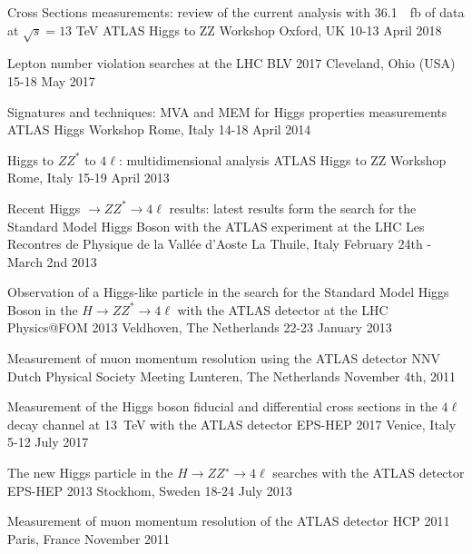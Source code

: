 
\begin{cvtalks}

\cvtalk
{Cross Sections measurements: review of the current analysis with \SI{36.1}{\per\femto\barn} of data at $\sqrt{s}=13$ \si{\tera\electronvolt}} %
{ATLAS Higgs to ZZ Workshop} %
{Oxford, UK} %
{10-13 April 2018} %

\cvtalk
{Lepton number violation searches at the LHC} %
{BLV 2017} %
{Cleveland, Ohio (USA)} %
{15-18 May 2017} %

\cvtalk
{Signatures and techniques: MVA and MEM for Higgs properties measurements} %
{ATLAS Higgs Workshop} %
{Rome, Italy} %
{14-18 April 2014} %

\cvtalk
{Higgs to $ZZ^{*}$ to $4\ell$: multidimensional analysis} %
{ATLAS Higgs to ZZ Workshop} %
{Rome, Italy} %
{15-19 April 2013} %

\cvtalk
{Recent Higgs $\to ZZ^{*}\to 4\ell$ results: latest results form the search for
the Standard Model Higgs Boson with the ATLAS experiment at the LHC} %
{Les Recontres de Physique de la Vall\'ee d'Aoste} %
{La Thuile, Italy} %
{February 24th - March 2nd 2013} %

\cvtalk
{Observation of a Higgs-like particle in the search for the Standard Model Higgs
Boson in the $H\to ZZ^{*}\to 4\ell$ with the ATLAS detector at the LHC} %
{Physics@FOM 2013} %
{Veldhoven, The Netherlands} %
{22-23 January 2013} %

\cvtalk
{Measurement of muon momentum resolution using the ATLAS detector} %
{NNV Dutch Physical Society Meeting} %
{Lunteren, The Netherlands} %
{November 4th, 2011} %

\end{cvtalks}



\cvtalk
{Measurement of the Higgs boson fiducial and differential cross sections in the
$4\ell$ decay channel at \SI{13}{\tera\electronvolt} with the ATLAS detector} %
{EPS-HEP 2017} %
{Venice, Italy} %
{5-12 July 2017} %

\cvtalk
{The new Higgs particle in the $H\to ZZ^{∗}\to 4\ell$ searches with the ATLAS
detector} %
{EPS-HEP 2013} %
{Stockhom, Sweden} %
{18-24 July 2013} %

\cvtalk
{Measurement of muon momentum resolution of the ATLAS detector} %
{HCP 2011} %
{Paris, France} %
{November 2011} %
